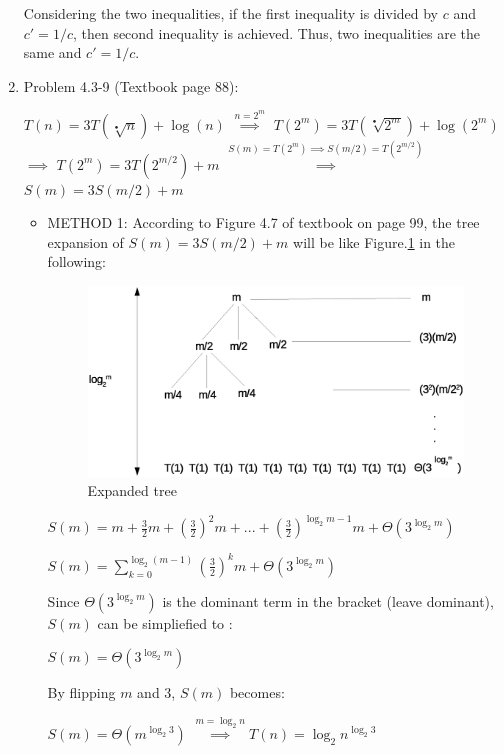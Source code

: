 \documentclass[11pt]{article}
\begin{document}
\begin{enumerate}
	Considering the two inequalities, if the first inequality is divided by $c$ and $c{'} = 1/c$, then second inequality is achieved. Thus, two inequalities are the same and $c{'} = 1/c$.  





\pagebreak

\item Problem 4.3-9 (Textbook page 88):
	
	$ T(n) = 3T(\sqrt[•]{n}) + \log(n) $ 
	$ \overset{n=2^m}{\implies} $ 
	$ T(2^m) = 3T(\sqrt[•]{2^m}) + \log(2^m) $ 
	$ \implies $ 
	$T(2^m) = 3T(2^{m/2}) + m $ 
	$ \overset{S(m)=T(2^m) \implies S(m/2)=T(2^{m/2})}{\implies} $ 
	$ S(m) = 3S(m/2) + m$ 
	
	
	\begin{itemize}
    	\item METHOD 1:
     	According to Figure 4.7 of textbook on page 99, the tree expansion of $ S(m) = 3S(m/2) + m$ will be like Figure.\ref{fig:prob2} in the following:
     	
		\begin{figure}[h!]
			\centerline{\includegraphics[width=5in]{prob2.eps}}
			\caption{Expanded tree}
			\label{fig:prob2}
		\end{figure}
	
		$S(m) = m+\frac{3}{2}m+{(\frac{3}{2})}^2m+...+{(\frac{3}{2})}^{\log_2{m-1}}m+\Theta(3^{\log_2{m}})$
		
		$S(m) = \sum_{k=0}^{\log_2{(m-1)}} {(\frac{3}{2})}^k m + \Theta(3^{\log_2{m}})  $
		
		Since $	\Theta(3^{\log_2{m}})  $ is the dominant term in the bracket (leave dominant), $S(m)$ can be simpliefied to :
		
		$S(m) = \Theta(3^{\log_2{m}}) $

		By flipping $m$ and $3$, $S(m)$ becomes:
		
		$S(m) = \Theta(m^{\log_2{3}}) $
		$\overset{m=\log_2{n}}{\implies}T(n)=\log_2{n}^{\log_2{3}}$	
	    

\end{itemize}
\end{enumerate}
\end{document}
